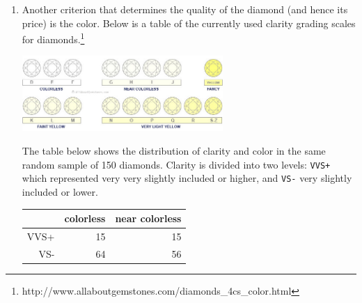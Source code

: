 \documentclass[11pt]{article}
\begin{document}
\begin{itemize}
\begin{enumerate}
\vfill

%

\pagebreak

\item Another criterion that determines the quality of the diamond (and hence its price) is the color. Below is a table of the currently used clarity grading scales for diamonds.\footnote{http://www.allaboutgemstones.com/diamonds\_4cs\_color.html} 
\begin{center}
\includegraphics[width=0.6\textwidth]{figures/diamond/diamond_color} 
\end{center}
The table below shows the distribution of clarity and color in the same random sample of 150 diamonds. Clarity is divided into two levels: \texttt{VVS+} which represented very very slightly included or higher, and \texttt{VS-} very slightly included or lower.

\begin{center}
\begin{tabular}{rrr}
  \hline
 & colorless & near colorless \\ 
  \hline
VVS+ &   15 &  15 \\ 
  VS- &  64 &  56 \\ 
   \hline
\end{tabular}
\end{center}


\end{enumerate}
\end{itemize}
\end{document}
